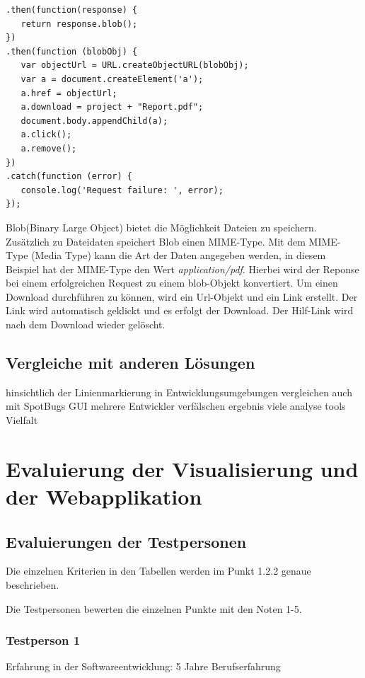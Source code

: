 \begin{samepage}%
	\begin{lstlisting}[float=tbhp]
.then(function(response) {
   return response.blob(); 
})
.then(function (blobObj) {
   var objectUrl = URL.createObjectURL(blobObj);
   var a = document.createElement('a');
   a.href = objectUrl;
   a.download = project + "Report.pdf";
   document.body.appendChild(a);
   a.click();
   a.remove(); 
})
.catch(function (error) {
   console.log('Request failure: ', error);
});
	\end{lstlisting}
\end{samepage}

Blob(Binary Large Object) bietet die Möglichkeit Dateien zu speichern. Zusätzlich zu Dateidaten speichert Blob einen MIME-Type. Mit dem MIME-Type (Media Type) kann die Art der Daten angegeben werden, in diesem Beispiel hat der MIME-Type den Wert \textit{application/pdf}. Hierbei wird der Reponse bei einem erfolgreichen Request zu einem blob-Objekt konvertiert. Um einen Download durchführen zu können, wird ein Url-Objekt und ein Link erstellt. Der Link wird automatisch geklickt und es erfolgt der Download. Der Hilf-Link wird nach dem Download wieder gelöscht.

\subsection{Vergleiche mit anderen Lösungen} 
hinsichtlich der Linienmarkierung in Entwicklungsumgebungen
vergleichen auch mit SpotBugs GUI
mehrere Entwickler verfälschen ergebnis
viele analyse tools Vielfalt
\section{Evaluierung der Visualisierung und der Webapplikation} 

\subsection{Evaluierungen der Testpersonen}
Die einzelnen Kriterien in den Tabellen werden im Punkt 1.2.2 genaue beschrieben. 

Die Testpersonen bewerten die einzelnen Punkte mit den Noten 1-5.
\subsubsection{Testperson 1}
Erfahrung in der Softwareentwicklung: 5 Jahre Berufserfahrung

